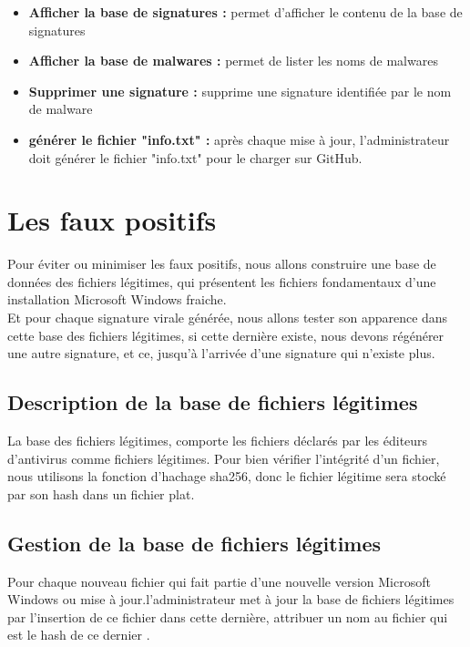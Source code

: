 \begin{itemize}
\item \textbf{Afficher la base de signatures : }permet d'afficher le contenu de la base de signatures 
\item \textbf{Afficher la base de malwares : }permet de lister les noms de malwares
\item \textbf{Supprimer une signature : }supprime une signature identifiée par le nom de malware
\item \textbf{générer le fichier "info.txt" : } après chaque mise à jour, l'administrateur doit générer le fichier "info.txt" pour le charger sur GitHub. 
\end{itemize}


\section{Les faux positifs }
Pour éviter ou minimiser les faux positifs, nous allons construire une base de données des fichiers légitimes, qui présentent les fichiers fondamentaux d'une installation Microsoft Windows fraiche.\\

Et pour chaque signature virale générée, nous allons tester son apparence dans cette base des fichiers légitimes, si cette dernière existe, nous devons régénérer une autre signature, et ce, jusqu'à l'arrivée d'une signature qui n'existe plus. 

\subsection{Description de la base de fichiers légitimes}
La base des fichiers légitimes, comporte les fichiers déclarés par les éditeurs d'antivirus comme fichiers légitimes. Pour bien vérifier l'intégrité d'un fichier, nous utilisons la fonction d'hachage sha256, donc le fichier légitime sera stocké par son hash dans un fichier plat.
\subsection{Gestion de la base de fichiers légitimes}
Pour chaque nouveau fichier qui fait partie d'une nouvelle version Microsoft Windows ou mise à jour.l'administrateur met à jour la base de fichiers légitimes par l'insertion de ce fichier dans cette dernière, attribuer un nom au fichier qui est le hash de ce dernier .\\

